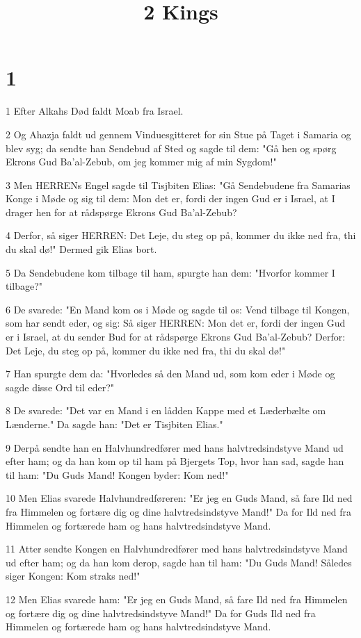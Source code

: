 

\title{2 Kings}


\chapter{1}

\par 1 Efter Alkahs Død faldt Moab fra Israel.
\par 2 Og Ahazja faldt ud gennem Vinduesgitteret for sin Stue på Taget i Samaria og blev syg; da sendte han Sendebud af Sted og sagde til dem: "Gå hen og spørg Ekrons Gud Ba'al-Zebub, om jeg kommer mig af min Sygdom!"
\par 3 Men HERRENs Engel sagde til Tisjbiten Elias: "Gå Sendebudene fra Samarias Konge i Møde og sig til dem: Mon det er, fordi der ingen Gud er i Israel, at I drager hen for at rådspørge Ekrons Gud Ba'al-Zebub?
\par 4 Derfor, så siger HERREN: Det Leje, du steg op på, kommer du ikke ned fra, thi du skal dø!" Dermed gik Elias bort.
\par 5 Da Sendebudene kom tilbage til ham, spurgte han dem: "Hvorfor kommer I tilbage?"
\par 6 De svarede: "En Mand kom os i Møde og sagde til os: Vend tilbage til Kongen, som har sendt eder, og sig: Så siger HERREN: Mon det er, fordi der ingen Gud er i Israel, at du sender Bud for at rådspørge Ekrons Gud Ba'al-Zebub? Derfor: Det Leje, du steg op på, kommer du ikke ned fra, thi du skal dø!"
\par 7 Han spurgte dem da: "Hvorledes så den Mand ud, som kom eder i Møde og sagde disse Ord til eder?"
\par 8 De svarede: "Det var en Mand i en lådden Kappe med et Læderbælte om Lænderne." Da sagde han: "Det er Tisjbiten Elias."
\par 9 Derpå sendte han en Halvhundredfører med hans halvtredsindstyve Mand ud efter ham; og da han kom op til ham på Bjergets Top, hvor han sad, sagde han til ham: "Du Guds Mand! Kongen byder: Kom ned!"
\par 10 Men Elias svarede Halvhundredføreren: "Er jeg en Guds Mand, så fare Ild ned fra Himmelen og fortære dig og dine halvtredsindstyve Mand!" Da for Ild ned fra Himmelen og fortærede ham og hans halvtredsindstyve Mand.
\par 11 Atter sendte Kongen en Halvhundredfører med hans halvtredsindstyve Mand ud efter ham; og da han kom derop, sagde han til ham: "Du Guds Mand! Således siger Kongen: Kom straks ned!"
\par 12 Men Elias svarede ham: "Er jeg en Guds Mand, så fare Ild ned fra Himmelen og fortære dig og dine halvtredsindstyve Mand!" Da for Guds Ild ned fra Himmelen og fortærede ham og hans halvtredsindstyve Mand.
